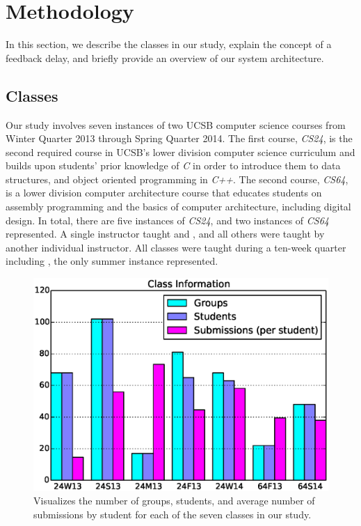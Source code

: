 \section{Methodology} 

In this section, we describe the classes in our study, explain the concept of a
feedback delay, and briefly provide an overview of our system architecture.

\subsection{Classes}

Our study involves seven instances of two UCSB computer science courses from
Winter Quarter 2013 through Spring Quarter 2014. The first course, \emph{CS24},
is the second required course in UCSB's lower division computer science
curriculum and builds upon students' prior knowledge of \emph{C} in order to
introduce them to data structures, and object oriented programming in
\emph{C++}. The second course, \emph{CS64}, is a lower division computer
architecture course that educates students on assembly programming and the
basics of computer architecture, including digital design. In total, there are
five instances of \emph{CS24}, and two instances of \emph{CS64} represented. A
single instructor taught  and , and all others were
taught by another individual instructor. All classes were taught during a
ten-week quarter including , the only summer instance represented.

\begin{figure}[!t]
\centering \includegraphics[width=5.25in]{graphs/Class_Information.eps}
\caption{Visualizes the number of groups, students, and average number of
  submissions by student for each of the seven classes in our study.}
\end{figure}

